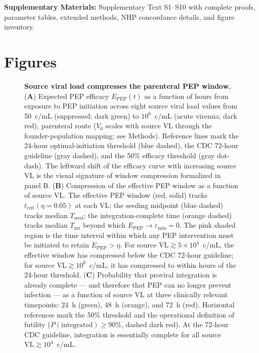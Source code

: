 \documentclass[10pt,letterpaper]{article}
\theoremstyle{definition}
\theoremstyle{remark}
\newcommand{\Tseed}{T_{\text{seed}}}
\newcommand{\Tint}{T_{\text{int}}}
\newcommand{\Epep}{E_{\text{PEP}}}
\newcommand{\tcrit}{t_{\text{crit}}}
\newcommand{\emin}{\varepsilon_{\min}}
\begin{document}
\textbf{Supplementary Materials:} Supplementary Text S1--S10 with complete proofs, parameter tables, extended methods, NHP concordance details, and figure inventory.

\newpage
\section*{Figures}

\begin{figure}[!ht]
\centering
\caption{\textbf{Source viral load compresses the parenteral PEP window.}
(\textbf{A}) Expected PEP efficacy $\Epep(t)$ as a function of hours from exposure to PEP initiation across eight source viral load values from 50~c/mL (suppressed; dark green) to $10^{6}$~c/mL (acute viremia; dark red), parenteral route ($V_{0}$ scales with source VL through the founder-population mapping; see Methods). Reference lines mark the 24-hour optimal-initiation threshold (blue dashed), the CDC 72-hour guideline (gray dashed), and the 50\% efficacy threshold (gray dot-dash). The leftward shift of the efficacy curve with increasing source VL is the visual signature of window compression formalized in panel B.
(\textbf{B}) Compression of the effective PEP window as a function of source VL. The effective PEP window (red, solid) tracks $\tcrit(\eta = 0.05)$ at each VL; the seeding midpoint (blue dashed) tracks median $\Tseed$; the integration-complete time (orange dashed) tracks median $\Tint$ beyond which $\Epep \to \emin = 0$. The pink shaded region is the time interval within which any PEP intervention must be initiated to retain $\Epep > \eta$. For source $\text{VL} \gtrsim 5 \times 10^{4}$~c/mL, the effective window has compressed below the CDC 72-hour guideline; for source $\text{VL} \gtrsim 10^{6}$~c/mL, it has compressed to within hours of the 24-hour threshold.
(\textbf{C}) Probability that proviral integration is already complete --- and therefore that PEP can no longer prevent infection --- as a function of source VL at three clinically relevant timepoints: 24~h (green), 48~h (orange), and 72~h (red). Horizontal references mark the 50\% threshold and the operational definition of futility ($P(\text{integrated}) \geq 90\%$, dashed dark red). At the 72-hour CDC guideline, integration is essentially complete for all source $\text{VL} \gtrsim 10^{4}$~c/mL.
}
\end{figure}
\end{document}
